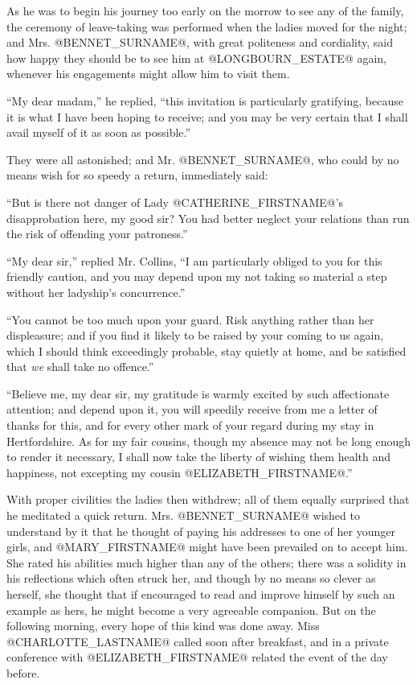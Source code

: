 As he was to begin his journey too early on the morrow to see any of the
family, the ceremony of leave-taking was performed when the ladies moved
for the night; and Mrs. @BENNET_SURNAME@, with great politeness and cordiality,
said how happy they should be to see him at @LONGBOURN_ESTATE@ again, whenever
his engagements might allow him to visit them.

``My dear madam,'' he replied, ``this invitation is particularly
gratifying, because it is what I have been hoping to receive; and
you may be very certain that I shall avail myself of it as soon as
possible.''

They were all astonished; and Mr. @BENNET_SURNAME@, who could by no means wish for
so speedy a return, immediately said:

``But is there not danger of Lady @CATHERINE_FIRSTNAME@'s disapprobation here, my
good sir? You had better neglect your relations than run the risk of
offending your patroness.''

``My dear sir,'' replied Mr. Collins, ``I am particularly obliged to you
for this friendly caution, and you may depend upon my not taking so
material a step without her ladyship's concurrence.''

``You cannot be too much upon your guard. Risk anything rather than her
displeasure; and if you find it likely to be raised by your coming to us
again, which I should think exceedingly probable, stay quietly at home,
and be satisfied that \textit{we} shall take no offence.''

``Believe me, my dear sir, my gratitude is warmly excited by such
affectionate attention; and depend upon it, you will speedily receive
from me a letter of thanks for this, and for every other mark of your
regard during my stay in Hertfordshire. As for my fair cousins, though
my absence may not be long enough to render it necessary, I shall now
take the liberty of wishing them health and happiness, not excepting my
cousin @ELIZABETH_FIRSTNAME@.''

With proper civilities the ladies then withdrew; all of them equally
surprised that he meditated a quick return. Mrs. @BENNET_SURNAME@ wished to
understand by it that he thought of paying his addresses to one of her
younger girls, and @MARY_FIRSTNAME@ might have been prevailed on to accept him.
She rated his abilities much higher than any of the others; there was
a solidity in his reflections which often struck her, and though by no
means so clever as herself, she thought that if encouraged to read
and improve himself by such an example as hers, he might become a very
agreeable companion. But on the following morning, every hope of this
kind was done away. Miss @CHARLOTTE_LASTNAME@ called soon after breakfast, and in a
private conference with @ELIZABETH_FIRSTNAME@ related the event of the day before.

